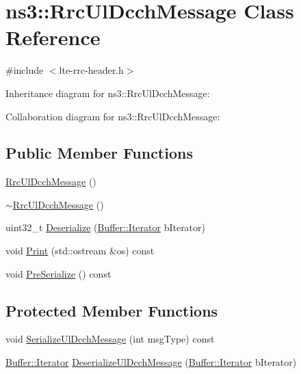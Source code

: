\hypertarget{classns3_1_1RrcUlDcchMessage}{}\section{ns3\+:\+:Rrc\+Ul\+Dcch\+Message Class Reference}
\label{classns3_1_1RrcUlDcchMessage}


{\ttfamily \#include $<$lte-\/rrc-\/header.\+h$>$}



Inheritance diagram for ns3\+:\+:Rrc\+Ul\+Dcch\+Message\+:


Collaboration diagram for ns3\+:\+:Rrc\+Ul\+Dcch\+Message\+:
\subsection*{Public Member Functions}
\begin{DoxyCompactItemize}
\item 
\hyperlink{classns3_1_1RrcUlDcchMessage_a20d11a994237b421a47edeebe17d493c}{Rrc\+Ul\+Dcch\+Message} ()
\item 
\hyperlink{classns3_1_1RrcUlDcchMessage_a4f9b3a4dbd09a8f5f56664e200715004}{$\sim$\+Rrc\+Ul\+Dcch\+Message} ()
\item 
uint32\+\_\+t \hyperlink{classns3_1_1RrcUlDcchMessage_a76f7263f39a6dbb893a42300d4e72e09}{Deserialize} (\hyperlink{classns3_1_1Buffer_1_1Iterator}{Buffer\+::\+Iterator} b\+Iterator)
\item 
void \hyperlink{classns3_1_1RrcUlDcchMessage_aa966b26f20cf09a2c03c3b1dbb7c2cab}{Print} (std\+::ostream \&os) const 
\item 
void \hyperlink{classns3_1_1RrcUlDcchMessage_ad944dd076a13812009a03e54913b2e9b}{Pre\+Serialize} () const 
\end{DoxyCompactItemize}
\subsection*{Protected Member Functions}
\begin{DoxyCompactItemize}
\item 
void \hyperlink{classns3_1_1RrcUlDcchMessage_a7a2208192859678d93bde325f936c365}{Serialize\+Ul\+Dcch\+Message} (int msg\+Type) const 
\item 
\hyperlink{classns3_1_1Buffer_1_1Iterator}{Buffer\+::\+Iterator} \hyperlink{classns3_1_1RrcUlDcchMessage_a11b944acd9ea5a459cc49a9fa11c3161}{Deserialize\+Ul\+Dcch\+Message} (\hyperlink{classns3_1_1Buffer_1_1Iterator}{Buffer\+::\+Iterator} b\+Iterator)
\end{DoxyCompactItemize}
